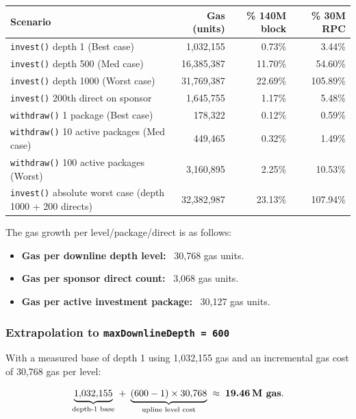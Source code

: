 \documentclass[11pt,a4paper]{article}
\begin{document}
\begin{center}
\renewcommand{\arraystretch}{1.3}
\begin{tabular}{p{7.5cm} r r r}
\toprule
\textbf{Scenario} & \textbf{Gas (units)} & \textbf{\% 140M block} & \textbf{\% 30M RPC} \\
\midrule
\texttt{invest()} depth 1 (Best case)              &  1{,}032{,}155 & 0.73\% & 3.44\% \\
\texttt{invest()} depth 500 (Med case)             & 16{,}385{,}387 & 11.70\% & 54.60\% \\
\texttt{invest()} depth 1000 (Worst case)          & 31{,}769{,}387 & 22.69\% & 105.89\% \\
\texttt{invest()} 200th direct on sponsor          &  1{,}645{,}755 & 1.17\% & 5.48\% \\
\texttt{withdraw()} 1 package (Best case)          &    178{,}322 & 0.12\% & 0.59\% \\
\texttt{withdraw()} 10 active packages (Med case)  &    449{,}465 & 0.32\% & 1.49\% \\
\texttt{withdraw()} 100 active packages (Worst)    &  3{,}160{,}895 & 2.25\% & 10.53\% \\
\texttt{invest()} absolute worst case (depth 1000 + 200 directs) & 32{,}382{,}987 & 23.13\% & 107.94\% \\
\bottomrule
\end{tabular}
\end{center}

The gas growth per level/package/direct is as follows:
\begin{itemize}[leftmargin=*]
    \item \textbf{Gas per downline depth level:} ~30{,}768 gas units.
    \item \textbf{Gas per sponsor direct count:} ~3{,}068 gas units.
    \item \textbf{Gas per active investment package:} ~30{,}127 gas units.
\end{itemize}

\subsubsection*{Extrapolation to \texttt{maxDownlineDepth = 600}}

With a measured base of depth 1 using 1{,}032{,}155 gas and an incremental gas cost of 30{,}768 gas per level:

\[
\underbrace{1{,}032{,}155}_{\text{depth-1 base}} \;+\;
\underbrace{(600 - 1)\times 30{,}768}_{\text{upline level cost}}
\;\approx\;
\textbf{19.46\,M gas}.
\]
\end{document}
